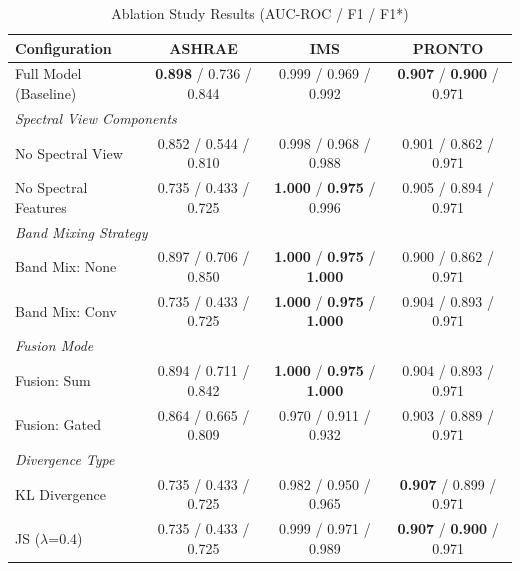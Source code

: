 \begin{table}[t]
\centering
\scriptsize
\caption{Ablation Study Results (AUC-ROC / F1 / F1*)}
\label{tab:ablation}
\begin{tabular}{l|ccc}
\toprule
\textbf{Configuration} & \textbf{ASHRAE} & \textbf{IMS} & \textbf{PRONTO} \\
\midrule
Full Model (Baseline) & \textbf{0.898} / 0.736 / 0.844 & 0.999 / 0.969 / 0.992 & \textbf{0.907} / \textbf{0.900} / 0.971 \\
\midrule
\multicolumn{4}{l}{\textit{Spectral View Components}} \\
\quad No Spectral View & 0.852 / 0.544 / 0.810 & 0.998 / 0.968 / 0.988 & 0.901 / 0.862 / 0.971 \\
\quad No Spectral Features & 0.735 / 0.433 / 0.725 & \textbf{1.000} / \textbf{0.975} / 0.996 & 0.905 / 0.894 / 0.971 \\
\midrule
\multicolumn{4}{l}{\textit{Band Mixing Strategy}} \\
\quad Band Mix: None & 0.897 / 0.706 / 0.850 & \textbf{1.000} / \textbf{0.975} / \textbf{1.000} & 0.900 / 0.862 / 0.971 \\
\quad Band Mix: Conv & 0.735 / 0.433 / 0.725 & \textbf{1.000} / \textbf{0.975} / \textbf{1.000} & 0.904 / 0.893 / 0.971 \\
\midrule
\multicolumn{4}{l}{\textit{Fusion Mode}} \\
\quad Fusion: Sum & 0.894 / 0.711 / 0.842 & \textbf{1.000} / \textbf{0.975} / \textbf{1.000} & 0.904 / 0.893 / 0.971 \\
\quad Fusion: Gated & 0.864 / 0.665 / 0.809 & 0.970 / 0.911 / 0.932 & 0.903 / 0.889 / 0.971 \\
\midrule
\multicolumn{4}{l}{\textit{Divergence Type}} \\
\quad KL Divergence & 0.735 / 0.433 / 0.725 & 0.982 / 0.950 / 0.965 & \textbf{0.907} / 0.899 / 0.971 \\
\quad JS ($\lambda$=0.4) & 0.735 / 0.433 / 0.725 & 0.999 / 0.971 / 0.989 & \textbf{0.907} / \textbf{0.900} / 0.971 \\
\bottomrule
\end{tabular}
\end{table}
